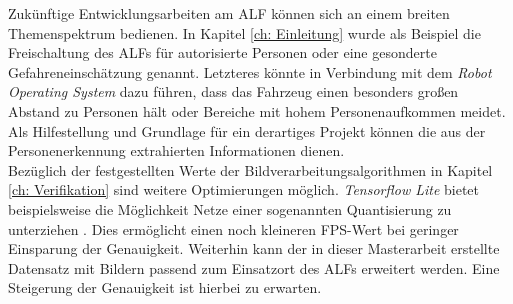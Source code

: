 Zukünftige Entwicklungsarbeiten am ALF können sich an einem breiten Themenspektrum bedienen. In Kapitel \ref{ch: Einleitung} wurde als Beispiel die Freischaltung des ALFs für autorisierte Personen oder eine gesonderte Gefahreneinschätzung genannt. Letzteres könnte in Verbindung mit dem \textit{Robot Operating System} dazu führen, dass das Fahrzeug einen besonders großen Abstand zu Personen hält oder Bereiche mit hohem Personenaufkommen meidet. Als Hilfestellung und Grundlage für ein derartiges Projekt können die aus der Personenerkennung extrahierten Informationen dienen. \\

Bezüglich der festgestellten Werte der Bildverarbeitungsalgorithmen in Kapitel \ref{ch: Verifikation} sind weitere Optimierungen möglich. \textit{Tensorflow Lite} bietet beispielsweise die Möglichkeit Netze einer sogenannten Quantisierung zu unterziehen \cite{tflite}. Dies ermöglicht einen noch kleineren FPS-Wert bei geringer Einsparung der Genauigkeit. Weiterhin kann der in dieser Masterarbeit erstellte Datensatz mit Bildern passend zum Einsatzort des ALFs erweitert werden. Eine Steigerung der Genauigkeit ist hierbei zu erwarten.\\





